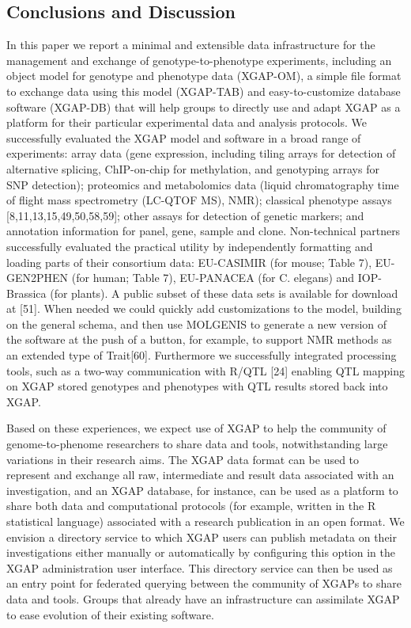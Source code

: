 \subsection{Conclusions and Discussion}
In this paper we report a minimal and extensible data infrastructure for the management and 
exchange of genotype-to-phenotype experiments, including an object model for genotype and 
phenotype data (XGAP-OM), a simple file format to exchange data using this model (XGAP-TAB) 
and easy-to-customize database software (XGAP-DB) that will help groups to directly use and 
adapt XGAP as a platform for their particular experimental data and analysis protocols. We 
successfully evaluated the XGAP model and software in a broad range of experiments: array 
data (gene expression, including tiling arrays for detection of alternative splicing, 
ChIP-on-chip for methylation, and genotyping arrays for SNP detection); proteomics and 
metabolomics data (liquid chromatography time of flight mass spectrometry (LC-QTOF MS), NMR); 
classical phenotype assays [8,11,13,15,49,50,58,59]; other assays for detection of genetic 
markers; and annotation information for panel, gene, sample and clone. Non-technical partners 
successfully evaluated the practical utility by independently formatting and loading parts of 
their consortium data: EU-CASIMIR (for mouse; Table 7), EU-GEN2PHEN (for human; Table 7), 
EU-PANACEA (for C. elegans) and IOP-Brassica (for plants). A public subset of these data sets 
is available for download at [51]. When needed we could quickly add customizations to the 
model, building on the general schema, and then use MOLGENIS to generate a new version of the 
software at the push of a button, for example, to support NMR methods as an extended type of 
Trait[60]. Furthermore we successfully integrated processing tools, such as a two-way 
communication with R/QTL [24] enabling QTL mapping on XGAP stored genotypes and phenotypes 
with QTL results stored back into XGAP.

Based on these experiences, we expect use of XGAP to help the community of genome-to-phenome 
researchers to share data and tools, notwithstanding large variations in their research aims. 
The XGAP data format can be used to represent and exchange all raw, intermediate and result 
data associated with an investigation, and an XGAP database, for instance, can be used as a 
platform to share both data and computational protocols (for example, written in the R 
statistical language) associated with a research publication in an open format. We envision 
a directory service to which XGAP users can publish metadata on their investigations either 
manually or automatically by configuring this option in the XGAP administration user interface. 
This directory service can then be used as an entry point for federated querying between the 
community of XGAPs to share data and tools. Groups that already have an infrastructure can 
assimilate XGAP to ease evolution of their existing software.

